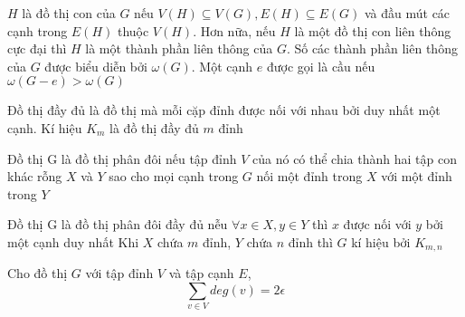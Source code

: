 \begin{definition}
    $H$ là đồ thị con của $G$ nếu $V(H) \subseteq V(G), E(H) \subseteq E(G)$ và đầu mút các cạnh trong $E(H)$ thuộc $V(H)$. Hơn nữa, nếu $H$ là một đồ thị con liên thông cực đại thì $H$ là một thành phần liên thông của $G$.
    Số các thành phần liên thông của $G$ được biểu diễn bởi $\omega(G)$. Một cạnh $e$ được gọi là cầu nếu $\omega(G-e) > \omega(G)$
\end{definition}

\begin{definition}
    Đồ thị đầy đủ là đồ thị mà mỗi cặp đỉnh được nối với nhau bởi duy nhất một cạnh. Kí hiệu $K_m$ là đồ thị đầy đủ $m$ đỉnh

    Đồ thị G là đồ thị phân đôi nếu tập đỉnh $V$ của nó có thể chia thành hai tập con khác rỗng $X$ và $Y$ sao cho mọi cạnh trong $G$ nối một đỉnh trong $X$ với một đỉnh trong $Y$

    Đồ thị G là đồ thị phân đôi đầy đủ nễu $\forall x \in X, y \in Y$ thì $x$ được nối với $y$ bởi một cạnh duy nhất
    Khi $X$ chứa $m$ đỉnh, $Y$ chứa $n$ đỉnh thì $G$ kí hiệu bởi $K_{m,n}$
    \begin{center}
        \hspace{2cm}
    \end{center}
\end{definition}
\begin{theorem}
    \label{thr:v2e}
    Cho đồ thị $G$ với tập đỉnh $V$ và tập cạnh $E$, $$\sum_{v\in V}deg(v) = 2\epsilon$$
\end{theorem}
